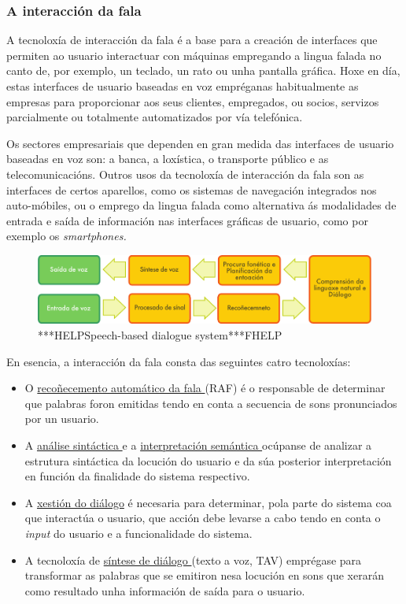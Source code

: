 \begin{multicols}{2}
  
\subsubsection{A interacción da fala}

  A tecnoloxía de interacción da fala é a base para a creación de interfaces que permiten ao usuario interactuar con máquinas empregando a lingua falada no canto de, por exemplo, un teclado, un rato ou unha pantalla gráfica. Hoxe en día, estas interfaces de usuario baseadas en voz empréganas habitualmente as empresas para proporcionar aos seus clientes, empregados, ou socios, servizos parcialmente ou totalmente automatizados por vía telefónica. 

Os sectores empresariais que dependen en gran medida das interfaces de usuario baseadas en voz son: a banca, a loxística, o transporte público e as telecomunicacións. Outros usos da tecnoloxía de interacción da fala son as interfaces de certos aparellos, como os sistemas de navegación integrados nos auto-móbiles, ou o emprego da lingua falada como alternativa ás modalidades de entrada e saída de información nas interfaces gráficas de usuario, como por exemplo os \textit{smartphones.}


\begin{figure}[htb]
  \vspace{-9mm}
  \center  \includegraphics[width=\textwidth]{../_media/galician/simple_speech-based_dialogue_architecture}
  \center
  \caption{***HELPSpeech-based dialogue system***FHELP}
  \label{fig:dialoguearch_ca}
\end{figure}

En esencia, a interacción da fala consta das seguintes catro tecnoloxías: 

    \begin{itemize}
      \item O \uline{recoñecemento automático da fala } (RAF) é o responsable de determinar que palabras foron emitidas tendo en conta a secuencia de sons pronunciados por un usuario.
      \item A \uline{análise sintáctica } e a \uline{interpretación semántica } ocúpanse de analizar a estrutura sintáctica da locución do usuario e da súa posterior interpretación en función da finalidade do sistema respectivo.
      \item A \uline{xestión do diálogo} é necesaria para determinar, pola parte do sistema coa que interactúa o usuario, que acción debe levarse a cabo tendo en conta o \textit{input} do usuario e a funcionalidade do sistema.
      \item A tecnoloxía de  \uline{síntese de diálogo }(texto a voz, TAV) emprégase para transformar as palabras que se emitiron nesa locución en sons que xerarán como resultado unha información de saída para o usuario.  


\end{itemize}
\end{multicols}
